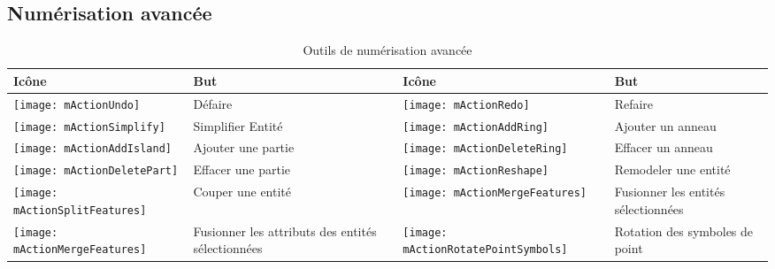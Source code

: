 
\subsection{Numérisation avancée}
\label{sec:advanced_edit}

\begin{table}[h]
\centering
\begin{tabular}{|l|p{5.5cm}|l|p{5.5cm}|}
\hline \textbf{Icône} & \textbf{But} & \textbf{Icône} & \textbf{But} \\
\hline \texttt{[image: mActionUndo]}
   & Défaire 
   & \texttt{[image: mActionRedo]}
   & Refaire \\
\hline \texttt{[image: mActionSimplify]}
   & Simplifier Entité
   & \texttt{[image: mActionAddRing]}
   & Ajouter un anneau \\
\hline \texttt{[image: mActionAddIsland]}
   & Ajouter une partie
   & \texttt{[image: mActionDeleteRing]}
   & Effacer un anneau \\
\hline \texttt{[image: mActionDeletePart]}
   & Effacer une partie
   & \texttt{[image: mActionReshape]}
   & Remodeler une entité \\
\hline \texttt{[image: mActionSplitFeatures]}
   & Couper une entité
   & \texttt{[image: mActionMergeFeatures]}
   & Fusionner les entités sélectionnées \\
\hline \texttt{[image: mActionMergeFeatures]}
   & Fusionner les attributs des entités sélectionnées
   &\texttt{[image: mActionRotatePointSymbols]}
   & Rotation des symboles de point\\
\hline
\end{tabular}
\caption{Outils de numérisation avancée}\label{tab:advanced_editing}
\end{table}


